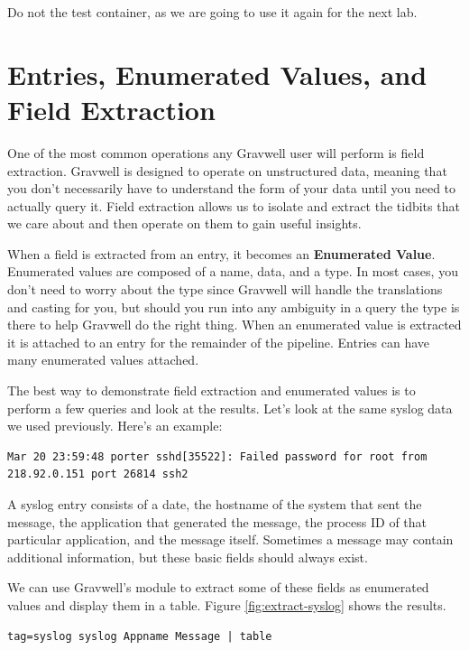 Do not  the test container, as we are
going to use it again for the next lab.

\clearpage
\section{Entries, Enumerated Values, and Field Extraction}
One of the most common operations any Gravwell user will perform is
field extraction. Gravwell is designed to operate on unstructured data,
meaning that you don't necessarily have to understand the form of your data
until you need to actually query it. Field extraction allows us to
isolate and extract the tidbits that we care about and then operate on
them to gain useful insights.

When a field is extracted from an entry, it becomes an \textbf{Enumerated Value}.
Enumerated values are composed of a name, data, and a type. In
most cases, you don't need to worry about the type since Gravwell will
handle the translations and casting for you, but should you run into any
ambiguity in a query the type is there to help Gravwell do the right
thing. When an enumerated value is extracted it is attached to an
entry for the remainder of the pipeline. Entries can have many enumerated values attached.

The best way to demonstrate field extraction and enumerated values is
to perform a few queries and look at the results. Let's look at the same
syslog data we used previously. Here's an example:

\begin{Verbatim}[breaklines=true]
Mar 20 23:59:48 porter sshd[35522]: Failed password for root from 218.92.0.151 port 26814 ssh2
\end{Verbatim}

A syslog entry consists of a date, the hostname of the system that sent the message, the application that generated the message, the process ID of that particular application, and the message itself. Sometimes a message may contain additional information, but these basic fields should always exist.

We can use Gravwell's  module to extract some of these fields as enumerated values and display them in a table. Figure \ref{fig:extract-syslog} shows the results.

\begin{Verbatim}[breaklines=true]
tag=syslog syslog Appname Message | table
\end{Verbatim}

